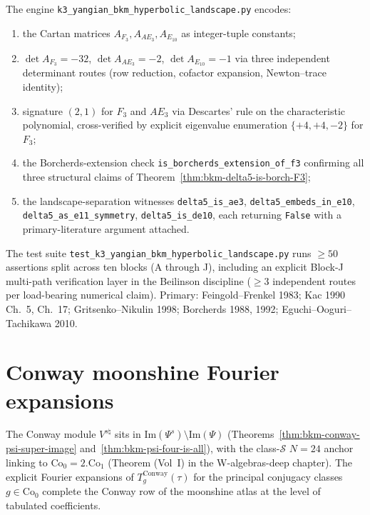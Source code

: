 \begin{remark}
\label{rem:bkm-hyperbolic-compute}
The engine \texttt{k3\_yangian\_bkm\_hyperbolic\_landscape.py}
encodes:
\begin{enumerate}[label=\textup{(\roman*)}]
\item the Cartan matrices $A_{F_3}, A_{AE_3}, A_{E_{10}}$ as
 integer-tuple constants;
\item $\det A_{F_3} = -32$, $\det A_{AE_3} = -2$, $\det A_{E_{10}} = -1$
 via three independent determinant routes (row reduction, cofactor
 expansion, Newton--trace identity);
\item signature $(2, 1)$ for $F_3$ and $AE_3$ via Descartes' rule on
 the characteristic polynomial, cross-verified by explicit eigenvalue
 enumeration $\{+4, +4, -2\}$ for $F_3$;
\item the Borcherds-extension check
 \texttt{is\_borcherds\_extension\_of\_f3} confirming all three
 structural claims of
 Theorem~\ref{thm:bkm-delta5-is-borch-F3};
\item the landscape-separation witnesses
 \texttt{delta5\_is\_ae3}, \texttt{delta5\_embeds\_in\_e10},
 \texttt{delta5\_as\_e11\_symmetry}, \texttt{delta5\_is\_de10},
 each returning \texttt{False} with a primary-literature argument
 attached.
\end{enumerate}
The test suite
\texttt{test\_k3\_yangian\_bkm\_hyperbolic\_landscape.py}
runs $\ge 50$ assertions split across ten blocks (A through J),
including an explicit Block-J multi-path verification layer in the
Beilinson discipline ($\ge 3$ independent routes per load-bearing
numerical claim). Primary: Feingold--Frenkel 1983; Kac 1990 Ch.~5, Ch.~17;
Gritsenko--Nikulin 1998; Borcherds 1988, 1992;
Eguchi--Ooguri--Tachikawa 2010.
\end{remark}

\section{Conway moonshine Fourier expansions}
\label{sec:bkm-conway-moonshine}

The Conway module $V^{s\natural}$ sits in
$\mathrm{Im}(\Psi^{s})\setminus\mathrm{Im}(\Psi)$
(Theorems~\ref{thm:bkm-conway-psi-super-image}
and~\ref{thm:bkm-psi-four-is-all}), with the class-$\mathcal S$
$N = 24$ anchor linking to $\mathrm{Co}_0 = 2.\mathrm{Co}_1$
(Theorem \cite{VolI} (Vol~I) in
the W-algebras-deep chapter).
The explicit Fourier expansions of $T_g^{\mathrm{Conway}}(\tau)$ for
the principal conjugacy classes $g \in \mathrm{Co}_0$ complete the
Conway row of the moonshine atlas at the level of tabulated
coefficients.

